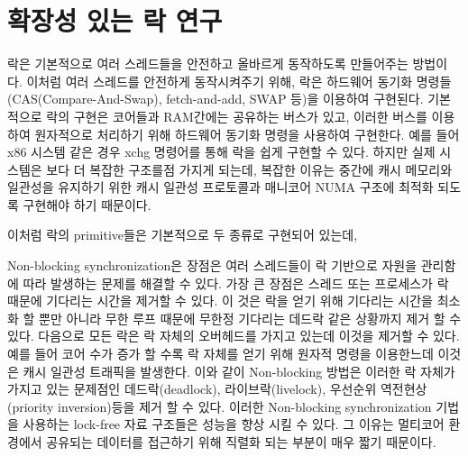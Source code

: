 \newpage
\section{확장성 있는 락 연구}
\label{sec:lockrelated}

락은 기본적으로 여러 스레드들을 안전하고 올바르게 동작하도록 만들어주는 방법이다. 
이처럼 여러 스레드를 안전하게 동작시켜주기 위해, 락은 하드웨어 동기화 명령들(CAS(Compare-And-Swap),
fetch-and-add, SWAP 등)을 이용하여 구현된다.
기본적으로 락의 구현은 코어들과 RAM간에는 공유하는 버스가 있고, 이러한 버스를 이용하여 원자적으로 처리하기 위해 
하드웨어 동기화 명령을 사용하여 구현한다. 
예를 들어 x86 시스템 같은 경우 xchg 명령어를 통해 락을 쉽게 구현할 수 있다.
하지만 실제 시스템은 보다 더 복잡한 구조를점 가지게 되는데, 
복잡한 이유는 중간에 캐시 메모리와 일관성을 유지하기 위한 
캐시 일관성 프로토콜과 매니코어 NUMA 구조에 최적화 되도록 구현해야 하기 때문이다.


이처럼 락의 primitive들은 기본적으로 두 종류로 구현되어 있는데, 


Non-blocking synchronization은 장점은 여러 스레드들이 락 기반으로 자원을 관리함에 따라
 발생하는 문제를 해결할 수 있다. 
가장 큰 장점은 스레드 또는 프로세스가 락 때문에 기다리는 시간을 제거할 수 있다.
이 것은 락을 얻기 위해 기다리는 시간을 최소화 할 뿐만 아니라 무한 루프 때문에 무한정 기다리는 
데드락 같은 상황까지 제거 할 수 있다. 
다음으로 모든 락은 락 자체의 오버헤드를 가지고 있는데 이것을 제거할 수 있다. 
예를 들어 코어 수가 증가 할 수록 락 자체를 얻기 위해 원자적 명령을 이용한느데 이것은 캐시 일관성 트래픽을 
발생한다. 
이와 같이 Non-blocking 방법은 이러한 락 자체가 가지고 있는 문제점인 데드락(deadlock), 라이브락(livelock), 
우선순위 역전현상(priority inversion)등을 제거 할 수 있다. 
이러한 Non-blocking synchronization 기법을 사용하는 lock-free 자료 구조들은 성능을 향상 시킬 수 있다. 
그 이유는 멀티코어 환경에서 공유되는 데이터를 접근하기 위해 직렬화 되는 부분이 매우 짧기 때문이다. 



